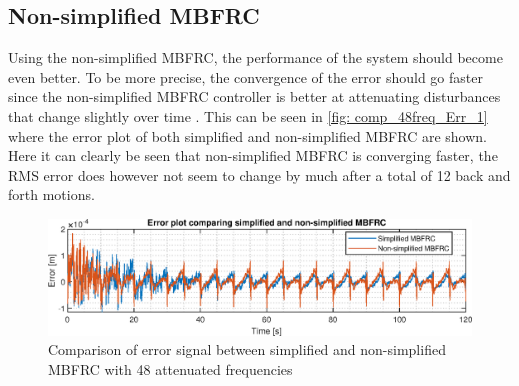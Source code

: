 \documentclass[journal]{IEEEtran}
\begin{document}
\subsection{Non-simplified MBFRC}
Using the non-simplified MBFRC, the performance of the system should become even better. To be more precise, the convergence of the error should go faster since the non-simplified MBFRC controller is better at attenuating disturbances that change slightly over time \cite{zwaans_frequency_nodate}. This can be seen in  \autoref{fig: comp_48freq_Err_1} where the error plot of both simplified and non-simplified MBFRC are shown. Here it can clearly be seen that non-simplified MBFRC is converging faster, the RMS error does however not seem to change by much after a total of 12 back and forth motions.
\begin{figure}
    \centering
    \includegraphics[width=0.8\linewidth]{./figures/nonSimple_MBFRC/comp_48freq_Err_2.eps}
    \caption{Comparison of error signal between simplified and non-simplified MBFRC with 48 attenuated frequencies}
    \label{fig: comp_48freq_Err_1}
\end{figure}
\end{document}
